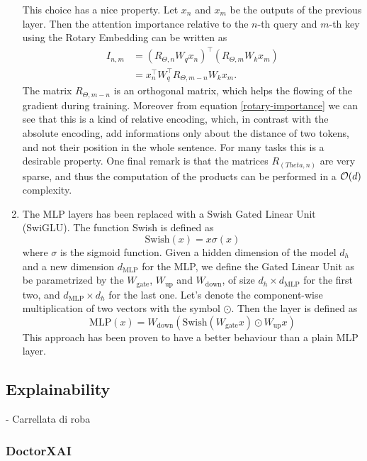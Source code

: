 \documentclass[]{marticle}
\begin{document}
\begin{enumerate}
This choice has a nice property. Let $x_n$ and $x_m$ be the outputs of the previous layer. Then
the attention importance relative to the $n$-th query and $m$-th key using the Rotary Embedding
can be written as
\begin{align}\label{rotary-importance}
I_{n,m} &= (R_{\Theta, n}W_q x_n)^\top (R_{\Theta, m}W_k x_m) \\ 
        &=  x_n^\top W_q^\top R_{\Theta, m-n} W_k x_m. \nonumber
\end{align}
The matrix $R_{\Theta, m-n}$ is an orthogonal matrix, which helps the flowing of the gradient
during training. Moreover from equation \ref{rotary-importance} we can see that this is a kind of
relative encoding, which, in contrast with the absolute encoding, add informations only about the
distance of two tokens, and not their position in the whole sentence. For many tasks this is a
desirable property. One final remark is that the matrices $R_(Theta, n)$ are very sparse, and thus
the computation of the products can be performed in a $\mathcal{O}(d)$ complexity.

\item The MLP layers has been replaced with a Swish Gated Linear Unit (SwiGLU). The function Swish
is defined as
$$ \text{Swish}(x) = x \sigma(x) $$
where $\sigma$ is the sigmoid function. Given a hidden dimension of the model $d_h$ and a new
dimension $d_\text{MLP}$ for the MLP, we define the Gated Linear Unit as be parametrized by the
$W_\text{gate}$, $W_\text{up}$ and $W_\text{down}$, of size $d_h\times d_\text{MLP}$ for the first
two, and $d_\text{MLP} \times d_h$ for the last one. Let's denote the component-wise multiplication
of two vectors with the symbol $\odot$. Then the layer is defined as $$ \text{MLP}(x) =
W_\text{down} (\text{Swish}(W_\text{gate} x) \odot W_\text{up} x) $$ This approach has been proven
to have a better behaviour than a plain MLP layer.
\end{enumerate}

\subsection{Explainability }

- Carrellata di roba

\subsubsection{DoctorXAI} \label{sect-drxai}

\end{document}
